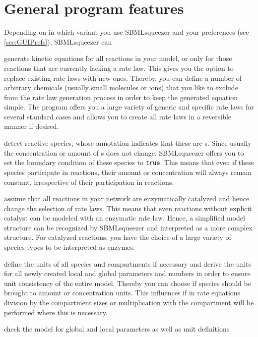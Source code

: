 \section{General program features}

Depending on in which variant you use SBMLsqueezer and your preferences (see \vref{sec:GUIPrefs}),
SBMLsqueezer can
\begin{dinglist}{52}
\item generate kinetic equations for all reactions in your model, or only for those
  reactions that are currently lacking a rate law.
  This gives you the option to replace existing rate laws with new ones.
  Thereby, you can define a number of arbitrary chemicals (usually small molecules or
  ions) that you like to exclude from the rate law generation process in order to keep
  the generated equation simple.
  The program offers you a large variety of generic and specific rate laws for several
  standard cases and allows you to create all rate laws in a reversible manner if desired.
\item detect reactive species, whose annotation indicates that these are {\gene}s.
  Since usually the concentration or amount of {\gene}s does not change, SBMLsqueezer
  offers you to set the boundary condition of these species to \texttt{true}.
  This means that even if these species participate in reactions, their amount or
  concentration will always remain constant, irrespective of their participation in reactions.
\item assume that all reactions in your network are enzymatically catalyzed and hence
  change the selection of rate laws. This means that even reactions without explicit
  catalyst can be modeled with an enzymatic rate law. Hence, a simplified model structure
  can be recognized by SBMLsqueezer and interpreted as a more complex structure.
  For catalyzed reactions, you have the choice of a large variety of species types to
  be interpreted as enzymes.
\item define the units of all species and compartments if necessary and derive the
  units for all newly created local and global parameters and numbers in order to ensure unit
  consistency of the entire model. Thereby you can choose if species should be brought
  to amount or concentration units. This influences if in rate equations division by
  the compartment sizes or multiplication with the compartment will be performed where
  this is necessary.
\item check the model for global and local parameters as well as unit definitions

\end{dinglist}
